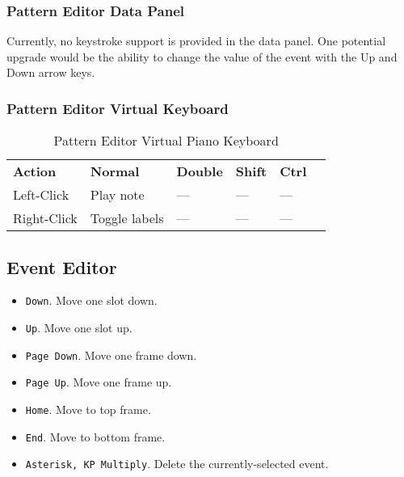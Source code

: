 \subsubsection{Pattern Editor Data Panel}
\label{subsubsec:kbd_mouse_pattern_editor_data_panel}

   Currently, no keystroke support is provided in the data panel.
   One potential upgrade would be the ability to change the value of the event
   with the Up and Down arrow keys.

\subsubsection{Pattern Editor Virtual Keyboard}
\label{subsubsec:kbd_mouse_pattern_editor_virtual_keyboard}

   \begin{table}[H]
      \centering
      \caption{Pattern Editor Virtual Piano Keyboard}
      \label{table:pattern_editor_virtual_piano_keyboard}
      \begin{tabular}{l l l l l l}
         \textbf{Action}   & \textbf{Normal} & \textbf{Double}    & \textbf{Shift} & \textbf{Ctrl}   \\
         Left-Click        & Play note       & ---                & ---            & ---             \\
         Right-Click       & Toggle labels   & ---                & ---            & ---             \\
      \end{tabular}
   \end{table}

\subsection{Event Editor}
\label{subsec:kbd_mouse_event_editor}

   \begin{itemize}
      \item \texttt{Down}.  Move one slot down.
      \item \texttt{Up}.  Move one slot up.
      \item \texttt{Page Down}.  Move one frame down.
      \item \texttt{Page Up}.  Move one frame up.
      \item \texttt{Home}.  Move to top frame.
      \item \texttt{End}.  Move to bottom frame.
      \item \texttt{Asterisk, KP Multiply}.  Delete the currently-selected event.
   \end{itemize}

